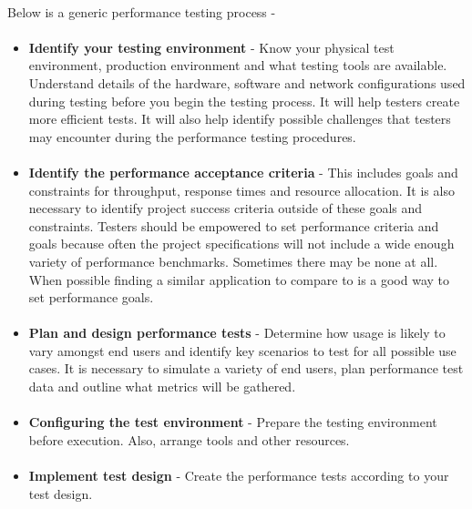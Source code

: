 \documentclass[../thesis.tex]{subfiles}
\begin{document}
\paragraph{}
Below is a generic performance testing process -
\paragraph{} 
\begin{itemize}
\item \textbf{Identify your testing environment} - Know your physical test environment, production environment and what testing tools are available. Understand details of the hardware, software and network configurations used during testing before you begin the testing process. It will help testers create more efficient tests.  It will also help identify possible challenges that testers may encounter during the performance testing procedures.
\paragraph{}
\item \textbf{Identify the performance acceptance criteria} - This includes goals and constraints for throughput, response times and resource allocation.  It is also necessary to identify project success criteria outside of these goals and constraints. Testers should be empowered to set performance criteria and goals because often the project specifications will not include a wide enough variety of performance benchmarks. Sometimes there may be none at all. When possible finding a similar application to compare to is a good way to set performance goals.
\paragraph{}
\item \textbf{Plan and design performance tests} - Determine how usage is likely to vary amongst end users and identify key scenarios to test for all possible use cases. It is necessary to simulate a variety of end users, plan performance test data and outline what metrics will be gathered.
\paragraph{}
\item \textbf{Configuring the test environment} - Prepare the testing environment before execution. Also, arrange tools and other resources.
\paragraph{}
\item \textbf{Implement test design} - Create the performance tests according to your test design.

\end{itemize}
\end{document}
